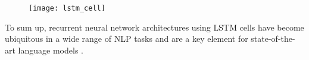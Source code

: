 \begin{figure}[H]
	\centering
	\texttt{[image: lstm\_cell]}
	\label{fig:ffarch}
\end{figure}

To sum up, recurrent neural network architectures using LSTM cells have become ubiquitous in a wide range of NLP tasks and are a key element for state-of-the-art language models \cite{jozefowicz2016exploring}.
